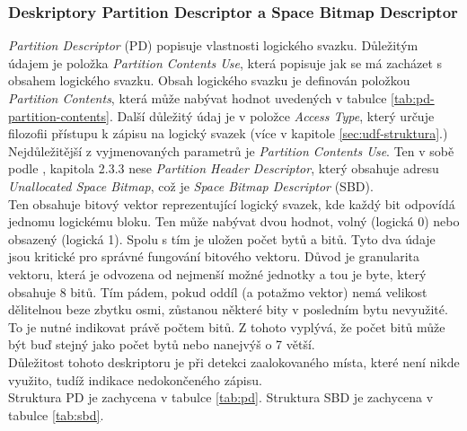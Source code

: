 \subsubsection{Deskriptory Partition Descriptor a Space Bitmap Descriptor}
\label{subsec:pd-sbd}
\textit{Partition Descriptor} (PD) popisuje vlastnosti logického svazku. Důležitým údajem je položka \textit{Partition Contents Use}, která popisuje jak se má zacházet s obsahem logického svazku. Obsah logického svazku je definován položkou \textit{Partition Contents}, která může nabývat hodnot uvedených v tabulce \ref{tab:pd-partition-contents}. Další důležitý údaj je v položce \textit{Access Type}, který určuje filozofii přístupu k zápisu na logický svazek (více v kapitole \ref{sec:udf-struktura}.)\\
Nejdůležitější z vyjmenovaných parametrů je \textit{Partition Contents Use}. Ten v sobě podle \cite{osta-udf-0201}, kapitola 2.3.3 nese \textit{Partition Header Descriptor}, který obsahuje adresu \textit{Unallocated Space Bitmap}, což je \textit{Space Bitmap Descriptor} (SBD).\\
Ten obsahuje bitový vektor reprezentující logický svazek, kde každý bit odpovídá jednomu logickému bloku. Ten může nabývat dvou hodnot, volný (logická 0) nebo obsazený (logická 1). Spolu s tím je uložen počet bytů a bitů. Tyto dva údaje jsou kritické pro správné fungování bitového vektoru. Důvod je granularita vektoru, která je odvozena od nejmenší možné jednotky a tou je byte, který obsahuje 8 bitů. Tím pádem, pokud oddíl (a potažmo vektor) nemá velikost dělitelnou beze zbytku osmi, zůstanou některé bity v posledním bytu nevyužité. To je nutné indikovat právě počtem bitů. Z tohoto vyplývá, že počet bitů může být buď stejný jako počet bytů nebo nanejvýš o 7 větší.\\
Důležitost tohoto deskriptoru je při detekci zaalokovaného místa, které není nikde využito, tudíž indikace nedokončeného zápisu.\\
Struktura PD je zachycena v tabulce \ref{tab:pd}. Struktura SBD je zachycena v tabulce \ref{tab:sbd}. 
